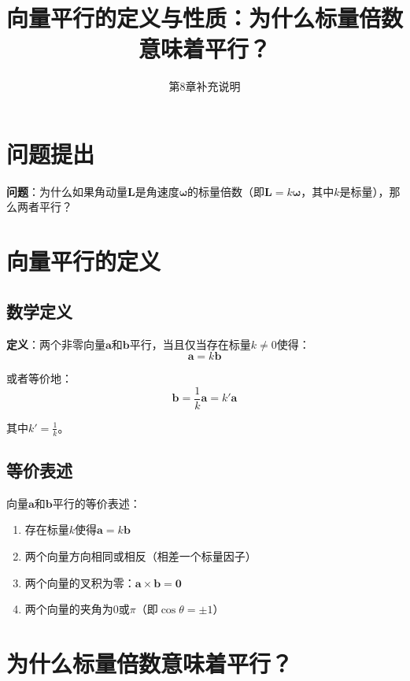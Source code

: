 \documentclass[12pt,a4paper]{article}
\title{向量平行的定义与性质：为什么标量倍数意味着平行？}
\author{第8章补充说明}
\date{}
\begin{document}
\maketitle

\section{问题提出}

\textbf{问题}：为什么如果角动量$\bm{L}$是角速度$\bm{\omega}$的标量倍数（即$\bm{L} = k \bm{\omega}$，其中$k$是标量），那么两者平行？

\section{向量平行的定义}

\subsection{数学定义}

\textbf{定义}：两个非零向量$\bm{a}$和$\bm{b}$平行，当且仅当存在标量$k \neq 0$使得：
\begin{equation}
\bm{a} = k \bm{b}
\label{eq:parallel_definition}
\end{equation}

或者等价地：
\begin{equation}
\bm{b} = \frac{1}{k} \bm{a} = k' \bm{a}
\end{equation}

其中$k' = \frac{1}{k}$。

\subsection{等价表述}

向量$\bm{a}$和$\bm{b}$平行的等价表述：
\begin{enumerate}
\item 存在标量$k$使得$\bm{a} = k \bm{b}$
\item 两个向量方向相同或相反（相差一个标量因子）
\item 两个向量的叉积为零：$\bm{a} \times \bm{b} = \bm{0}$
\item 两个向量的夹角为$0$或$\pi$（即$\cos\theta = \pm 1$）
\end{enumerate}

\section{为什么标量倍数意味着平行？}
\end{document}
